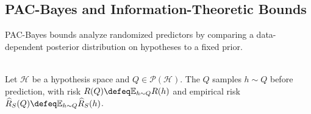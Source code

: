 \subsection{PAC-Bayes and Information-Theoretic Bounds}

PAC-Bayes bounds analyze randomized predictors by comparing a data-dependent posterior distribution on hypotheses to a fixed prior.

\begin{definition} \label{def:sl-randomized-predictor} \\
Let $\mathcal{H}$ be a hypothesis space and $Q\in\mathcal{P}(\mathcal{H})$. The  $Q$ samples $h\sim Q$ before prediction, with risk $R(Q)\defeq\mathbb{E}_{h\sim Q}R(h)$ and empirical risk $\widehat{R}_S(Q)\defeq\mathbb{E}_{h\sim Q}\widehat{R}_S(h)$.
\end{definition}

